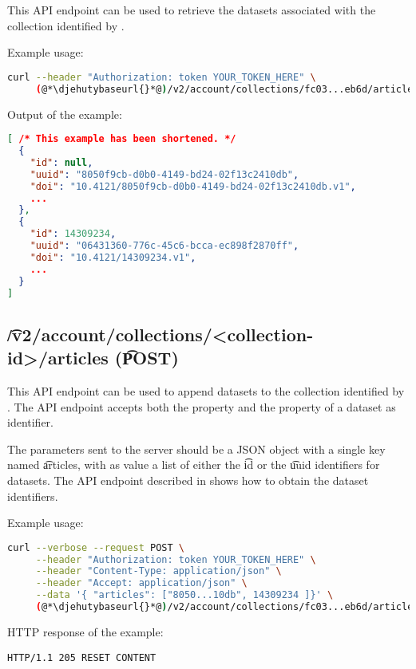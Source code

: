   This API endpoint can be used to retrieve the datasets associated with
  the collection identified by .

  Example usage:
\begin{lstlisting}[language=bash]
curl --header "Authorization: token YOUR_TOKEN_HERE" \
     (@*\djehutybaseurl{}*@)/v2/account/collections/fc03...eb6d/articles | jq
\end{lstlisting}

  Output of the example:
\begin{lstlisting}[language=JSON]
[ /* This example has been shortened. */
  {
    "id": null,
    "uuid": "8050f9cb-d0b0-4149-bd24-02f13c2410db",
    "doi": "10.4121/8050f9cb-d0b0-4149-bd24-02f13c2410db.v1",
    ...
  },
  {
    "id": 14309234,
    "uuid": "06431360-776c-45c6-bcca-ec898f2870ff",
    "doi": "10.4121/14309234.v1",
    ...
  }
]
\end{lstlisting}

\subsection{\t{/v2/account/collections/<collection-id>/articles} (\t{POST})}
\label{sec:v2-account-collection-articles}
  This API endpoint can be used to append datasets to the collection identified
  by \code{collection-id}.  The API endpoint accepts both the \code{id} property
  and the \code{uuid} property of a dataset as identifier.

  The parameters sent to the server should be a JSON object with a single key
  named \t{articles}, with as value a list of either the \t{id} or the \t{uuid}
  identifiers for datasets.  The API endpoint described in
   shows how to obtain the dataset
  identifiers.

  Example usage:
\begin{lstlisting}[language=bash]
curl --verbose --request POST \
     --header "Authorization: token YOUR_TOKEN_HERE" \
     --header "Content-Type: application/json" \
     --header "Accept: application/json" \
     --data '{ "articles": ["8050...10db", 14309234 ]}' \
     (@*\djehutybaseurl{}*@)/v2/account/collections/fc03...eb6d/articles
\end{lstlisting}

  HTTP response of the example:
\begin{lstlisting}
HTTP/1.1 205 RESET CONTENT
\end{lstlisting}

